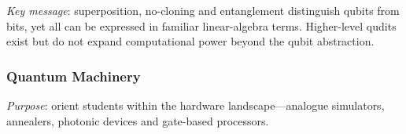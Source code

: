 

\emph{Key message}: superposition, no-cloning and entanglement distinguish qubits from bits, 
yet all can be expressed in familiar linear-algebra terms. 
Higher-level qudits exist but do not expand computational power beyond the qubit abstraction.

\subsubsection{Quantum Machinery}

\emph{Purpose}: orient students within the hardware landscape—analogue simulators, annealers, photonic devices and gate-based processors.


